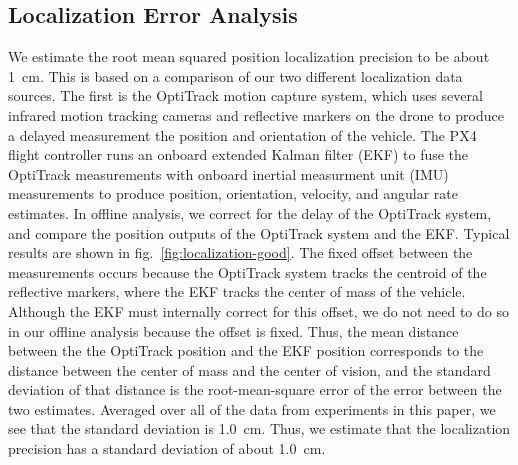 
\subsection{Localization Error Analysis}
\label{sec:supp-localization-error}

We estimate the root mean squared position localization precision to be about \SI{1}{cm}. This is based on a comparison of our two different localization data sources. The first is the OptiTrack motion capture system, which uses several infrared motion tracking cameras and reflective markers on the drone to produce a delayed measurement the position and orientation of the vehicle. The PX4 flight controller runs an onboard extended Kalman filter (EKF) to fuse the OptiTrack measurements with onboard inertial measurment unit (IMU) measurements to produce position, orientation, velocity, and angular rate estimates. In offline analysis, we correct for the delay of the OptiTrack system, and compare the position outputs of the OptiTrack system and the EKF. Typical results are shown in fig.~\ref{fig:localization-good}. The fixed offset between the measurements occurs because the OptiTrack system tracks the centroid of the reflective markers, where the EKF tracks the center of mass of the vehicle. Although the EKF must internally correct for this offset, we do not need to do so in our offline analysis because the offset is fixed. Thus, the mean distance between the the OptiTrack position and the EKF position corresponds to the distance between the center of mass and the center of vision, and the standard deviation of that distance is the root-mean-square error of the error between the two estimates. Averaged over all of the data from experiments in this paper, we see that the standard deviation is \SI{1.0}{cm}. Thus, we estimate that the localization precision has a standard deviation of about \SI{1.0}{cm}.

